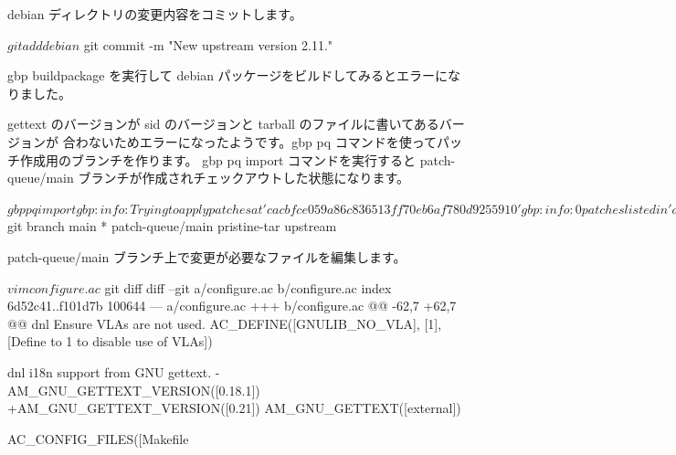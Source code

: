 \documentclass[mingoth,a4paper]{jsarticle}
\begin{document}
debian ディレクトリの変更内容をコミットします。

\begin{commandline}
$ git add debian
$ git commit -m "New upstream version 2.11."
\end{commandline}

gbp buildpackage を実行して debian パッケージをビルドしてみるとエラーになりました。


gettext のバージョンが sid のバージョンと tarball のファイルに書いてあるバージョンが
合わないためエラーになったようです。gbp pq コマンドを使ってパッチ作成用のブランチを作ります。
gbp pq import コマンドを実行すると patch-queue/main ブランチが作成されチェックアウトした状態になります。

\begin{commandline}
$ gbp pq import
gbp:info: Trying to apply patches at 'cacbfce059a86c836513ff70eb6af780d9255910'
gbp:info: 0 patches listed in 'debian/patches/series' imported on 'patch-queue/main'

$ git branch
  main
* patch-queue/main
  pristine-tar
  upstream
\end{commandline}

patch-queue/main ブランチ上で変更が必要なファイルを編集します。

\begin{commandline}
$ vim configure.ac
$ git diff
diff --git a/configure.ac b/configure.ac
index 6d52c41..f101d7b 100644
--- a/configure.ac
+++ b/configure.ac
@@ -62,7 +62,7 @@ dnl Ensure VLAs are not used.
 AC_DEFINE([GNULIB_NO_VLA], [1], [Define to 1 to disable use of VLAs])

 dnl i18n support from GNU gettext.
-AM_GNU_GETTEXT_VERSION([0.18.1])
+AM_GNU_GETTEXT_VERSION([0.21])
 AM_GNU_GETTEXT([external])

 AC_CONFIG_FILES([Makefile
\end{commandline}
\end{document}
